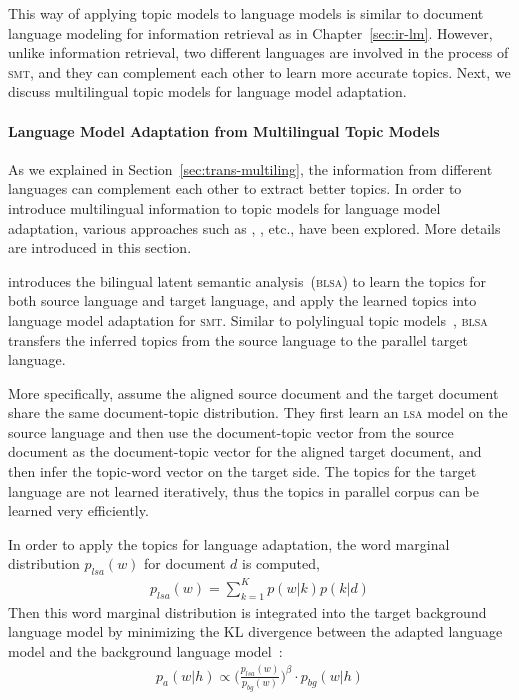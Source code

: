 This way of applying topic models to language models is 
similar to document language modeling for information retrieval
as in Chapter~\ref{sec:ir-lm}. However, unlike
information retrieval, two different languages are involved in the
process of \textsc{smt}, and they can complement each other to learn
more accurate topics. Next, we discuss multilingual topic models
for language model adaptation.

\paragraph{Language Model Adaptation from Multilingual Topic Models}

As we explained in Section~\ref{sec:trans-multiling}, the information
from different languages can complement each other to extract better
topics. In order to introduce multilingual information to topic models
for language model adaptation, various approaches such as
\cite{Tam-2007}, \cite{Ruiz-2011}, \cite{Yu-2013} etc., have been
explored. More details are introduced in this section.

\cite{Tam-2007} introduces the bilingual latent semantic
analysis~(\textsc{blsa}) to learn the topics for both source language
and target language, and apply the learned topics into language model
adaptation for \textsc{smt}. Similar to polylingual topic models~\citep{mimno-09}, \textsc{blsa} transfers the inferred
topics from the source language to the parallel target language.

More specifically, \cite{Tam-2007} assume the aligned source document
and the target document share the same document-topic distribution.
They first learn an \textsc{lsa} model on the source
language and then use the document-topic vector from the
source document as the document-topic vector for the aligned
target document, and then infer the topic-word vector on the
target side. The topics for the target language are not learned
iteratively, thus the topics in parallel corpus can be learned very
efficiently.

In order to apply the topics for language adaptation, the word
marginal distribution $p_{lsa}(w)$ for document $d$ is computed,
\begin{align}
p_{lsa}(w) = \sum_{k=1}^K p(w|k) p(k|d)
\end{align}
Then this word marginal distribution is integrated into the target background language model by minimizing the KL divergence between the adapted language model and the background language model~\citep{Kneser-1997b}:
\begin{align}
\label{eq:mdi}
p_a(w|h) \propto \Big( \frac{p_{lsa}(w)}{p_{bg}(w)} \Big) ^{\beta} \cdot p_{bg}(w|h)
\end{align}

